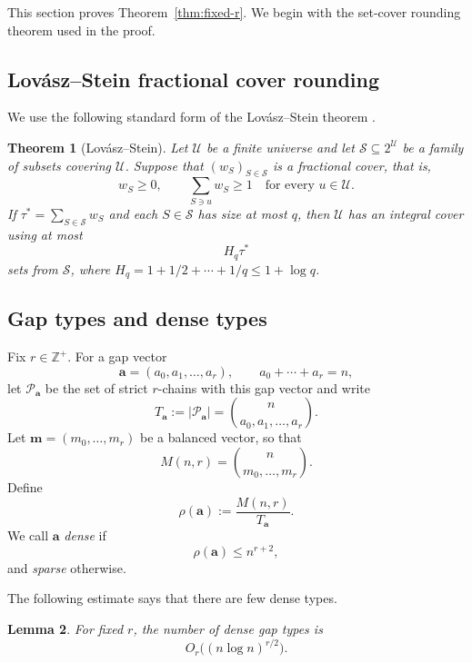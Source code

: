\documentclass[11pt]{article}
\newtheorem{theorem}{Theorem}[section]
\newtheorem{lemma}[theorem]{Lemma}
\theoremstyle{definition}
\theoremstyle{remark}
\newcommand{\calP}{\mathcal P}
\newcommand{\calU}{\mathcal U}
\newcommand{\calS}{\mathcal S}
\begin{document}
This section proves Theorem~\ref{thm:fixed-r}.  We begin with the set-cover rounding theorem used in the proof.

\subsection{Lov\'asz--Stein fractional cover rounding}

We use the following standard form of the Lov\'asz--Stein theorem \citep{Johnson1974,Stein1974,Lovasz1975}.

\begin{theorem}[Lov\'asz--Stein]\label{thm:LS}
Let $\calU$ be a finite universe and let $\calS\subseteq 2^{\calU}$ be a family of subsets covering $\calU$.  Suppose that $(w_S)_{S\in\calS}$ is a fractional cover, that is,
\[
   w_S\ge 0,
   \qquad
   \sum_{S\ni u}w_S\ge 1
   \quad\text{for every }u\in\calU.
\]
If $\tau^*=\sum_{S\in\calS}w_S$ and each $S\in\calS$ has size at most $q$, then $\calU$ has an integral cover using at most
\[
   H_q\tau^*
\]
sets from $\calS$, where $H_q=1+1/2+\cdots+1/q\le 1+\log q$.
\end{theorem}

\subsection{Gap types and dense types}

Fix $r\in \mathbb{Z}^+$.  For a gap vector
\[
   \mathbf a=(a_0,a_1,\ldots,a_r),
   \qquad a_0+\cdots+a_r=n,
\]
let $\calP_{\mathbf a}$ be the set of strict $r$-chains with this gap vector and write
\[
   T_{\mathbf a}:=|\calP_{\mathbf a}|=\binom{n}{a_0,a_1,\ldots,a_r}.
\]
Let $\mathbf m=(m_0,
\ldots,m_r)$ be a balanced vector, so that
\[
   M(n,r)=\binom{n}{m_0,
\ldots,m_r}.
\]
Define
\[
   \rho(\mathbf a):=\frac{M(n,r)}{T_{\mathbf a}}.
\]
We call $\mathbf a$ \emph{dense} if
\[
   \rho(\mathbf a)\le n^{r+2},
\]
and \emph{sparse} otherwise.

The following estimate says that there are few dense types.

\begin{lemma}\label{lem:dense-general}
For fixed $r$, the number of dense gap types is
\[
   O_r\bigl((n\log n)^{r/2}\bigr).
\]
\end{lemma}
\end{document}
